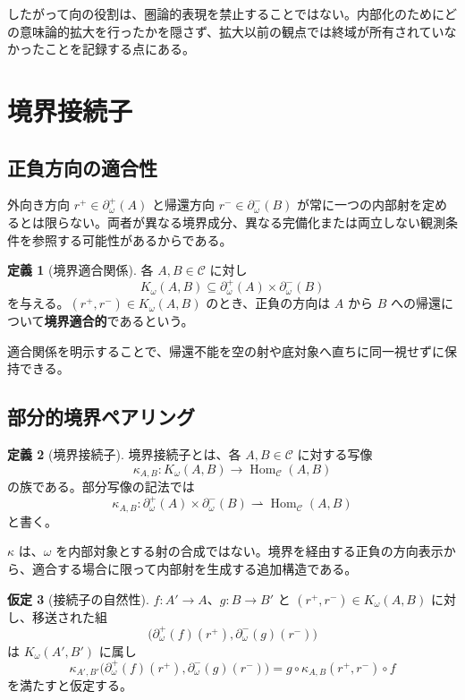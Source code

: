 \documentclass[a4paper,11pt]{ltjsarticle}
\theoremstyle{definition}
\newtheorem{definition}{定義}[section]
\newtheorem{assumption}[definition]{仮定}
\theoremstyle{plain}
\newcommand{\Hom}{\operatorname{Hom}}
\begin{document}
したがって向の役割は、圏論的表現を禁止することではない。内部化のためにどの意味論的拡大を行ったかを隠さず、拡大以前の観点では終域が所有されていなかったことを記録する点にある。

\section{境界接続子}

\subsection{正負方向の適合性}

外向き方向 $r^+\in\partial_\omega^+(A)$ と帰還方向 $r^-\in\partial_\omega^-(B)$ が常に一つの内部射を定めるとは限らない。両者が異なる境界成分、異なる完備化または両立しない観測条件を参照する可能性があるからである。

\begin{definition}[境界適合関係]
各 $A,B\in\mathcal C$ に対し
\[
 K_\omega(A,B)
 \subseteq
 \partial_\omega^+(A)\times\partial_\omega^-(B)
\]
を与える。$(r^+,r^-)\in K_\omega(A,B)$ のとき、正負の方向は $A$ から $B$ への帰還について\textbf{境界適合的}であるという。
\end{definition}

適合関係を明示することで、帰還不能を空の射や底対象へ直ちに同一視せずに保持できる。

\subsection{部分的境界ペアリング}

\begin{definition}[境界接続子]
境界接続子とは、各 $A,B\in\mathcal C$ に対する写像
\begin{equation}
 \kappa_{A,B}:
 K_\omega(A,B)
 \longrightarrow
 \Hom_{\mathcal C}(A,B)
 \label{eq:boundary-connector}
\end{equation}
の族である。部分写像の記法では
\[
 \kappa_{A,B}:
 \partial_\omega^+(A)\times\partial_\omega^-(B)
 \rightharpoonup
 \Hom_{\mathcal C}(A,B)
\]
と書く。
\end{definition}

$\kappa$ は、$\omega$ を内部対象とする射の合成ではない。境界を経由する正負の方向表示から、適合する場合に限って内部射を生成する追加構造である。

\begin{assumption}[接続子の自然性]
$f:A'\to A$、$g:B\to B'$ と $(r^+,r^-)\in K_\omega(A,B)$ に対し、移送された組
\[
 \bigl(\partial_\omega^+(f)(r^+),
       \partial_\omega^-(g)(r^-)\bigr)
\]
は $K_\omega(A',B')$ に属し
\begin{equation}
 \kappa_{A',B'}
 \bigl(\partial_\omega^+(f)(r^+),
       \partial_\omega^-(g)(r^-)\bigr)
 =g\circ\kappa_{A,B}(r^+,r^-)\circ f
 \label{eq:connector-naturality}
\end{equation}
を満たすと仮定する。
\end{assumption}
\end{document}
